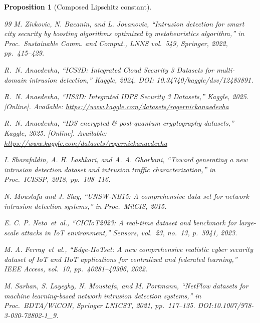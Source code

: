 \documentclass{ieeeaccess}
\newtheorem{proposition}[theorem]{Proposition}
\begin{document}
\begin{proposition}[Composed Lipschitz constant]
\begin{thebibliography}{99}
 M. Zivkovic, N. Bacanin, and L. Jovanovic, ``Intrusion detection for smart city security by boosting algorithms optimized by metaheuristics algorithm,'' in \textit{Proc.\ Sustainable Comm. and Comput.}, LNNS vol.~549, Springer, 2022, pp.~415--429.

 R.~N. Anaedevha, ``ICS3D: Integrated Cloud Security 3 Datasets for multi-domain intrusion detection,'' Kaggle, 2024. DOI: 10.34740/kaggle/dsv/12483891.

 R.~N. Anaedevha, ``IIS3D: Integrated IDPS Security 3 Datasets,'' Kaggle, 2025. [Online]. Available: \url{https://www.kaggle.com/datasets/rogernickanaedevha}

 R.~N. Anaedevha, ``IDS encrypted \& post-quantum cryptography datasets,'' Kaggle, 2025. [Online]. Available: \url{https://www.kaggle.com/datasets/rogernickanaedevha}

 I. Sharafaldin, A. H. Lashkari, and A. A. Ghorbani, ``Toward generating a new intrusion detection dataset and intrusion traffic characterization,'' in \textit{Proc.\ ICISSP}, 2018, pp.~108--116.

 N. Moustafa and J. Slay, ``UNSW-NB15: A comprehensive data set for network intrusion detection systems,'' in \textit{Proc.\ MilCIS}, 2015.

 E. C. P. Neto~\textit{et~al.}, ``CICIoT2023: A real-time dataset and benchmark for large-scale attacks in IoT environment,'' \textit{Sensors}, vol.~23, no.~13, p.~5941, 2023.

 M. A. Ferrag~\textit{et~al.}, ``Edge-IIoTset: A new comprehensive realistic cyber security dataset of IoT and IIoT applications for centralized and federated learning,'' \textit{IEEE Access}, vol.~10, pp.~40281--40306, 2022.

 M. Sarhan, S. Layeghy, N. Moustafa, and M. Portmann, ``NetFlow datasets for machine learning-based network intrusion detection systems,'' in \textit{Proc.\ BDTA/WiCON}, Springer LNICST, 2021, pp.~117--135. DOI:10.1007/978-3-030-72802-1\_9.

\end{thebibliography}

\vspace{-1.0cm}


\end{proposition}
\end{document}
